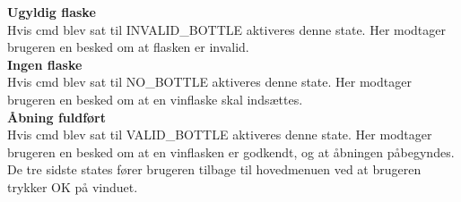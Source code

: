 \textbf{Ugyldig flaske}\\
Hvis cmd blev sat til INVALID_BOTTLE aktiveres denne state. Her modtager brugeren en besked om at flasken er invalid.\\

\textbf{Ingen flaske}\\
Hvis cmd blev sat til NO_BOTTLE aktiveres denne state. Her modtager brugeren en besked om at en vinflaske skal indsættes.
\\

\textbf{Åbning fuldført}\\
Hvis cmd blev sat til VALID_BOTTLE aktiveres denne state. Her modtager brugeren en besked om at en vinflasken er godkendt, og at åbningen påbegyndes.\\


De tre sidste states fører brugeren tilbage til hovedmenuen ved at brugeren trykker OK på vinduet.
